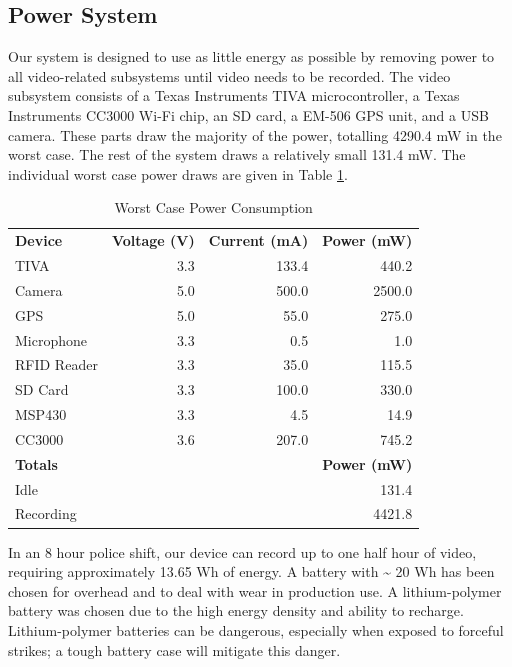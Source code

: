 \documentclass[12pt]{article}
\begin{document}
\subsection{Power System}
Our system is designed to use as little energy as possible by removing power to
all video-related subsystems until video needs to be recorded. The video
subsystem consists of a Texas Instruments TIVA
microcontroller\cite[p.~1880]{tm4c1294ncpdt}, a Texas Instruments CC3000 Wi-Fi
chip\cite[p.~6]{cc3000}, an SD card\cite[p.~19,23]{sd_standard}, a EM-506 GPS
unit\cite[p.~10]{em506}, and a USB camera\cite[p.~245]{usb_standard}. These
parts draw the majority of the power, totalling 4290.4 mW in the worst case.
The rest of the system draws a relatively small 131.4 mW. The individual worst
case power draws are given in Table \ref{tab:worst_case_power}.

\begin{table}[h!]
    \centering
    \caption{Worst Case Power Consumption}
    \begin{tabular}{lrrr}
        \textbf{Device} & \textbf{Voltage (V)} & \textbf{Current (mA)} & \textbf{Power (mW)}\\
        TIVA & 3.3 & 133.4 & 440.2\\
        Camera & 5.0 & 500.0 & 2500.0\\
        GPS & 5.0 & 55.0 & 275.0\\
        Microphone & 3.3 & 0.5 & 1.0\\
        RFID Reader & 3.3 & 35.0 & 115.5\\
        SD Card & 3.3 & 100.0 & 330.0\\
        MSP430 & 3.3 & 4.5 & 14.9\\
        CC3000 & 3.6 & 207.0 & 745.2\\
        \hline
        \textbf{Totals} & & & \textbf{Power (mW)}\\
        Idle & & & 131.4\\
        Recording & & & 4421.8\\
    \end{tabular}
    \label{tab:worst_case_power}
\end{table}

In an 8 hour police shift, our device can record up to one half hour of video,
requiring approximately 13.65 Wh of energy. A battery with \textasciitilde{} 20
Wh has been chosen for overhead and to deal with wear in production use. A
lithium-polymer battery was chosen due to the high energy density and ability
to recharge. Lithium-polymer batteries can be dangerous, especially when
exposed to forceful strikes; a tough battery case will mitigate this danger.
\end{document}

